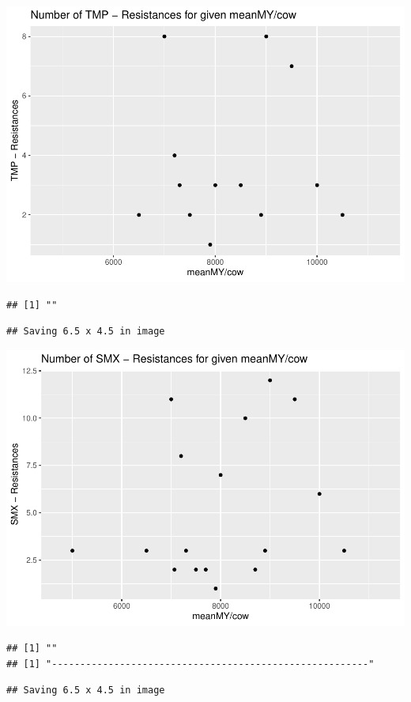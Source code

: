 \documentclass[
]{article}
\begin{document}
\includegraphics{NResistenzen_files/figure-latex/numerical_variables-9.pdf}

\begin{verbatim}
## [1] ""
\end{verbatim}

\begin{verbatim}
## Saving 6.5 x 4.5 in image
\end{verbatim}

\includegraphics{NResistenzen_files/figure-latex/numerical_variables-10.pdf}

\begin{verbatim}
## [1] ""
## [1] "--------------------------------------------------------"
\end{verbatim}

\begin{verbatim}
## Saving 6.5 x 4.5 in image
\end{verbatim}
\end{document}
